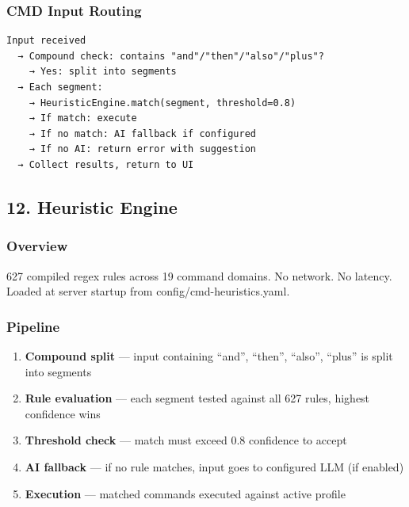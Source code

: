 \documentclass[11pt, a4paper, DIV=14]{scrartcl}
\renewcommand{\texttt}[1]{{\ttfamily\fontsize{8.5}{10.5}\selectfont\color{BabbNavy}#1}}
\let\origRule\rule
\renewcommand{\rule}[2]{\par\noindent{\color{BabbBorder}\origRule{#1}{#2}}\par}
\begin{document}
\subsubsection{CMD Input Routing}\label{cmd-input-routing}

\begin{verbatim}
Input received
  → Compound check: contains "and"/"then"/"also"/"plus"?
    → Yes: split into segments
  → Each segment:
    → HeuristicEngine.match(segment, threshold=0.8)
    → If match: execute
    → If no match: AI fallback if configured
    → If no AI: return error with suggestion
  → Collect results, return to UI
\end{verbatim}

\begin{center}\rule{0.5\linewidth}{0.5pt}\end{center}

\subsection{12. Heuristic Engine}\label{heuristic-engine}

\subsubsection{Overview}\label{overview-2}

627 compiled regex rules across 19 command domains. No network. No
latency. Loaded at server startup from
\texttt{config/cmd-heuristics.yaml}.

\subsubsection{Pipeline}\label{pipeline}

\begin{enumerate}
\def\labelenumi{\arabic{enumi}.}
\tightlist
\item
  \textbf{Compound split} --- input containing ``and'', ``then'',
  ``also'', ``plus'' is split into segments
\item
  \textbf{Rule evaluation} --- each segment tested against all 627
  rules, highest confidence wins
\item
  \textbf{Threshold check} --- match must exceed 0.8 confidence to
  accept
\item
  \textbf{AI fallback} --- if no rule matches, input goes to configured
  LLM (if enabled)
\item
  \textbf{Execution} --- matched commands executed against active
  profile
\end{enumerate}
\end{document}
